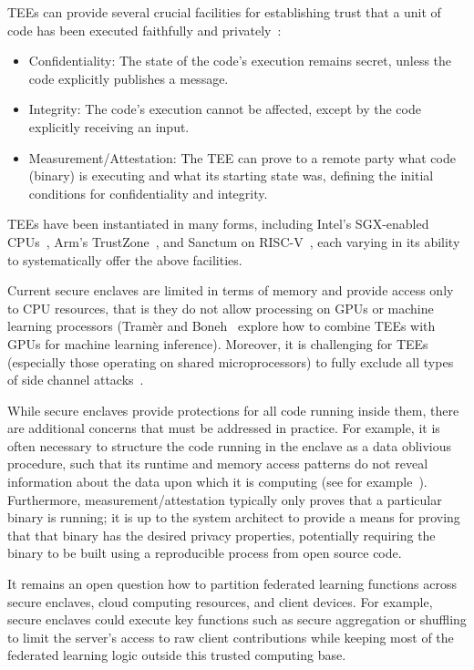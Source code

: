TEEs can provide several crucial facilities for establishing trust that a unit of code has been executed faithfully and privately~\cite{subramanyan2017formal}:
\begin{itemize}
\item Confidentiality: The state of the code's execution remains secret, unless the code explicitly publishes a message.
\item Integrity: The code's execution cannot be affected, except by the code explicitly receiving an input.
\item Measurement/Attestation: The TEE can prove to a remote party what code (binary) is executing and what its starting state was, defining the initial conditions for confidentiality and integrity.
\end{itemize}

TEEs have been instantiated in many forms, including Intel's SGX-enabled CPUs~\cite{intel2012architecture,costan2016intel}, Arm's TrustZone~\cite{ArmTrustzone,AndroidTrusty}, and Sanctum on RISC-V~\cite{costan2016sanctum}, each varying in its ability to systematically offer the above facilities.

Current secure enclaves are limited in terms of memory and provide access only to CPU resources, that is they do not allow processing on GPUs or machine learning processors (Tram\`er and Boneh~\cite{tramer2018slalom} explore how to combine TEEs with GPUs for machine learning inference).  Moreover, it is challenging for TEEs (especially those operating on shared microprocessors) to fully exclude all types of side channel attacks~\cite{van2018foreshadow}.

While secure enclaves provide protections for all code running inside them, there are additional concerns that must be addressed in practice.  For example, it is often necessary to structure the code running in the enclave as a data oblivious procedure, such that its runtime and memory access patterns do not reveal information about the data upon which it is computing (see for example~\cite{prochlo}).  Furthermore, measurement/attestation typically only proves that a particular binary is running; it is up to the system architect to provide a means for proving that that binary has the desired privacy properties, potentially requiring the binary to be built using a reproducible process from open source code.

It remains an open question how to partition federated learning functions across secure enclaves, cloud computing resources, and client devices. For example, secure enclaves could execute key functions such as secure aggregation or shuffling to limit the server's access to raw client contributions while keeping most of the federated learning logic outside this trusted computing base. 

